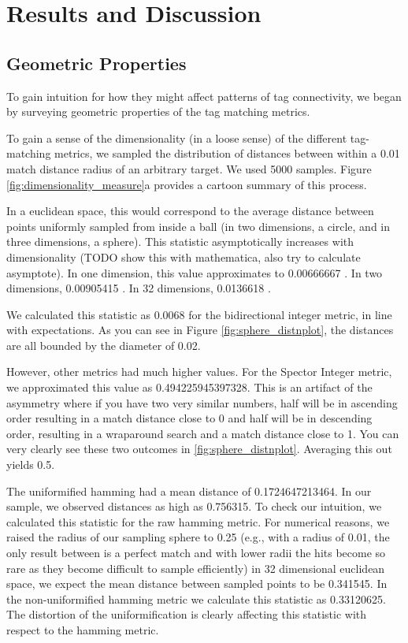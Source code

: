 \section{Results and Discussion}

\subsection{Geometric Properties}

To gain intuition for how they might affect patterns of tag connectivity, we began by surveying geometric properties of the tag matching metrics.





To gain a sense of the dimensionality (in a loose sense) of the different tag-matching metrics, we sampled the distribution of distances between within a 0.01 match distance radius of an arbitrary target.
We used 5000 samples.
Figure \ref{fig:dimensionality_measure}a provides a cartoon summary of this process.

In a euclidean space, this would correspond to the average distance between points uniformly sampled from inside a ball (in two dimensions, a circle, and in three dimensions, a sphere).
This statistic asymptotically increases with dimensionality (TODO show this with mathematica, also try to calculate asymptote).
In one dimension, this value approximates to 0.00666667 \citep{dunbar1997average}.
In two dimensions, 0.00905415 \citep{dunbar1997average}.
In 32 dimensions, 0.0136618 \citep{dunbar1997average}.

We calculated this statistic as 0.0068 for the bidirectional integer metric, in line with expectations.
As you can see in Figure \ref{fig:sphere_distnplot}, the distances are all bounded by the diameter of 0.02.

However, other metrics had much higher values.
For the Spector Integer metric, we approximated this value as 0.494225945397328.
This is an artifact of the asymmetry where if you have two very similar numbers, half will be in ascending order resulting in a match distance close to 0 and half will be in descending order, resulting in a wraparound search and a match distance close to 1.
You can very clearly see these two outcomes in \ref{fig:sphere_distnplot}.
Averaging this out yields 0.5.

The uniformified hamming had a mean distance of 0.1724647213464.
In our sample, we observed distances as high as 0.756315.
To check our intuition, we calculated this statistic for the raw hamming metric.
For numerical reasons, we raised the radius of our sampling sphere to 0.25 (e.g., with a radius of 0.01, the only result between is a perfect match and with lower radii the hits become so rare as they become difficult to sample efficiently)
in 32 dimensional euclidean space, we expect the mean distance between sampled points to be 0.341545.
In the non-uniformified hamming metric we calculate this statistic as 0.33120625.
The distortion of the uniformification is clearly affecting this statistic with respect to the hamming metric.

